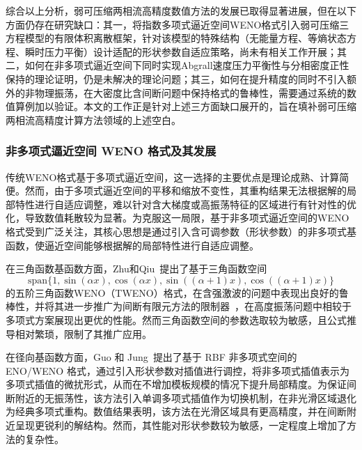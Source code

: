\documentclass[12pt,a4paper]{article}
\numberwithin{equation}{section}    %
\begin{document}
综合以上分析，弱可压缩两相流高精度数值方法的发展已取得显著进展，但在以下方面仍存在研究缺口：其一，将指数多项式逼近空间WENO格式引入弱可压缩三方程模型的有限体积离散框架，针对该模型的特殊结构（无能量方程、等熵状态方程、瞬时压力平衡）设计适配的形状参数自适应策略，尚未有相关工作开展；其二，如何在非多项式逼近空间下同时实现Abgrall速度压力平衡性与分相密度正性保持的理论证明，仍是未解决的理论问题；其三，如何在提升精度的同时不引入额外的非物理振荡，在大密度比含间断问题中保持格式的鲁棒性，需要通过系统的数值算例加以验证。本文的工作正是针对上述三方面缺口展开的，旨在填补弱可压缩两相流高精度计算方法领域的上述空白。
\subsubsection{非多项式逼近空间 WENO 格式及其发展}

传统WENO格式基于多项式逼近空间，这一选择的主要优点是理论成熟、计算简便。然而，由于多项式逼近空间的平移和缩放不变性，其重构结果无法根据解的局部特性进行自适应调整，难以针对含大梯度或高振荡特征的区域进行有针对性的优化，导致数值耗散较为显著。为克服这一局限，基于非多项式逼近空间的WENO格式受到广泛关注，其核心思想是通过引入含可调参数（形状参数）的非多项式基函数，使逼近空间能够根据解的局部特性进行自适应调整。

在三角函数基函数方面，Zhu和Qiu~\cite{zhu2010trigonometric}提出了基于三角函数空间
\begin{equation}
    \mathrm{span}\{1, \sin(\alpha x), \cos(\alpha x), \sin((\alpha+1)x), \cos((\alpha+1)x)\}
\end{equation}
的五阶三角函数WENO（TWENO）格式，在含强激波的问题中表现出良好的鲁棒性，并将其进一步推广为间断有限元方法的限制器~\cite{zhu2013weno}，在高度振荡问题中相较于多项式方案展现出更优的性能。然而三角函数空间的参数选取较为敏感，且公式推导相对繁琐，限制了其推广应用。

在径向基函数方面，Guo 和 Jung~\cite{guo2017radial,GUO201727}提出了基于 RBF 非多项式空间的 ENO/WENO 格式，通过引入形状参数对插值进行调控，将非多项式插值表示为多项式插值的微扰形式，从而在不增加模板规模的情况下提升局部精度。为保证间断附近的无振荡性，该方法引入单调多项式插值作为切换机制，在非光滑区域退化为经典多项式重构。数值结果表明，该方法在光滑区域具有更高精度，并在间断附近呈现更锐利的解结构。然而，其性能对形状参数较为敏感，一定程度上增加了方法的复杂性。
\end{document}
